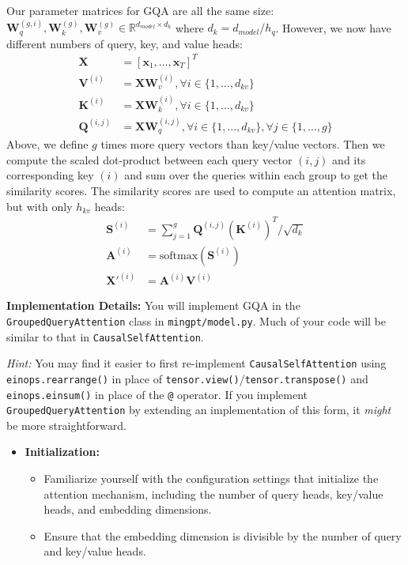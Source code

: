 \documentclass[11pt,addpoints,answers]{exam}
\newcommand{\Rb}{\mathbb{R}}
\newcommand{\xv}{\mathbf{x}}
\newcommand{\Av}{\mathbf{A}}
\newcommand{\Kv}{\mathbf{K}}
\newcommand{\Qv}{\mathbf{Q}}
\newcommand{\Sv}{\mathbf{S}}
\newcommand{\Vv}{\mathbf{V}}
\newcommand{\Wv}{\mathbf{W}}
\newcommand{\Xv}{\mathbf{X}}
\begin{document}
\begin{questions}
\begin{parts}
    Our parameter matrices for GQA are all the same size: $\Wv_q^{(g,i)},\Wv_k^{(g)},\Wv_v^{(g)} \in \Rb^{d_{model} \times d_k}$  where $d_k = d_{model}/h_q$. However, we now have different numbers of query, key, and value heads:
    \begin{align*}
        \Xv &= [\xv_1, \ldots, \xv_T]^T  \\
        \Vv^{(i)} &= \Xv \Wv_v^{(i)}, \forall i \in \{1, \ldots, d_{kv} \} \\
        \Kv^{(i)} &= \Xv \Wv_k^{(i)}, \forall i \in \{1, \ldots, d_{kv} \} \\
        \Qv^{(i,j)} &= \Xv \Wv_q^{(i,j)}, \forall i \in \{1, \ldots, d_{kv} \}, \forall j \in \{1, \ldots, g \} 
    \end{align*}
    Above, we define $g$ times more query vectors than key/value vectors. 
    Then we compute the scaled dot-product between each query vector $(i,j)$ and its corresponding key $(i)$ and sum over the queries within each group to get the similarity scores. The similarity scores are used to compute an attention matrix, but with only $h_{kv}$ heads:
    \begin{align*}
        \Sv^{(i)} &= \sum_{j=1}^{g} \Qv^{(i,j)} (\Kv^{(i)})^T / \sqrt{d_k} \\
        \Av^{(i)} &= \text{softmax}(\Sv^{(i)}) \\
        \Xv'^{(i)} &= \Av^{(i)} \Vv^{(i)} 
    \end{align*}

    \textbf{Implementation Details:}
    You will implement GQA in the \lstinline{GroupedQueryAttention} class in \lstinline{mingpt/model.py}. Much of your code will be similar to that in \lstinline{CausalSelfAttention}. 

    \emph{Hint:} You may find it easier to first re-implement \lstinline{CausalSelfAttention} using \lstinline{einops.rearrange()} in place of \lstinline{tensor.view()}/\lstinline{tensor.transpose()} and \lstinline{einops.einsum()} in place of the \lstinline{@} operator. If you implement \lstinline{GroupedQueryAttention} by extending an implementation of this form, it \emph{might} be more straightforward.


    \begin{itemize}
        
    \item \textbf{ Initialization:}
    \begin{itemize}
        \item Familiarize yourself with the configuration settings that initialize the attention mechanism, including the number of query heads, key/value heads, and embedding dimensions.
        \item Ensure that the embedding dimension is divisible by the number of query and key/value heads.
    \end{itemize}
    

\end{itemize}
\end{parts}
\end{questions}
\end{document}
